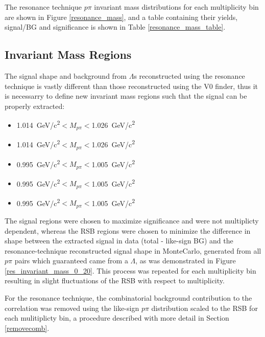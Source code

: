 \documentclass[ALICE,manyauthors]{ALICE_analysis_notes}
\begin{document}
The resonance technique $p\pi$ invariant mass distributions for each multiplicity bin are shown in Figure \ref{resonance_mass}, and a table containing their yields, signal/BG and significance is shown in Table \ref{resonance_mass_table}.


\subsection{Invariant Mass Regions}

The signal shape and background from $\Lambda$s reconstructed using the resonance technique is vastly different than those reconstructed using the V0 finder, thus it is necessarry to define new invariant mass regions such that the signal can be properly extracted:

\begin{itemize}
	\item {}  \SI{1.014}{GeV/c^2}$< M_{p\pi} < $\SI{1.026}{GeV/c^2}
	\item {}  \SI{1.014}{GeV/c^2}$< M_{p\pi} < $\SI{1.026}{GeV/c^2}
	\item  {}  \SI{0.995}{GeV/c^2}$< M_{p\pi} < $\SI{1.005}{GeV/c^2}
	\item  {}  \SI{0.995}{GeV/c^2}$< M_{p\pi} < $\SI{1.005}{GeV/c^2}
	\item  {}  \SI{0.995}{GeV/c^2}$< M_{p\pi} < $\SI{1.005}{GeV/c^2}
\end{itemize}

The signal regions were chosen to maximize significance and were not multiplicty dependent, whereas the RSB regions were chosen to minimize the difference in shape between the extracted signal in data (total - like-sign BG) and the resonance-technique reconstructed signal shape in MonteCarlo, generated from all $p\pi$ pairs which guaranteed came from a $\Lambda$, as was demonstrated in Figure \ref{res_invariant_mass_0_20}. This process was repeated for each multiplicity bin resulting in slight fluctuations of the RSB with respect to multiplicity.

For the resonance technique, the combinatorial background contribution to the correlation was removed using the like-sign $p\pi$ distribution scaled to the RSB for each mulitiplicty bin, a procedure described with more detail in Section \ref{removecomb}.
\end{document}
